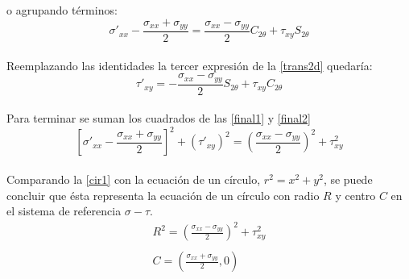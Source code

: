 \documentclass[../notas medios.tex]{subfiles}
\begin{document}
o agrupando términos: 
%
\begin{equation}
	\sigma ' _{xx} -\frac{\sigma _{xx} + \sigma _{yy}}{2} = \frac{\sigma_{xx} - \sigma _{yy}}{2} C_{2\theta} + \tau _{xy} S_{2\theta} 
\label{final1}
\end{equation}
\\
%
Reemplazando las identidades la tercer expresión de la \cref{trans2d} quedaría:\\
%
\begin{equation}
	\tau ' _{xy} = - \frac{\sigma _{xx} - \sigma _{yy}}{2} S_{2\theta} + \tau _{xy} C_{2\theta}
\label{final2}
\end{equation}
\\
%
Para terminar se suman los cuadrados de las \cref {final1}  y \cref {final2}
%
\begin{equation}
	\left[ \sigma ' _{xx} - \frac{\sigma _{xx} + \sigma _{yy} }{2} \right] ^2 + \left(\tau ' _{xy} \right)  ^2 =  \left( \frac{\sigma _{xx} - \sigma _{yy} }{2} \right) ^2 + \tau ^2 _{xy}
	\label{cir1}
\end{equation}
\\
Comparando la \cref{cir1} con la ecuación de un círculo, $r^2 = x^2 + y^2$, se puede concluir que ésta representa la ecuación de un círculo con radio $R$ y centro $C$  en el sistema de referencia $\sigma - \tau$.\\
\begin{align}
	R ^ 2 = \left( \frac{\sigma _{xx} - \sigma _{yy}}{2} \right) ^2 + \tau ^2 _{xy} \\\\
	C = \left( \frac{\sigma _{xx} + \sigma _{yy}}{2},0 \right)
\end{align}
%
%
\end{document}
